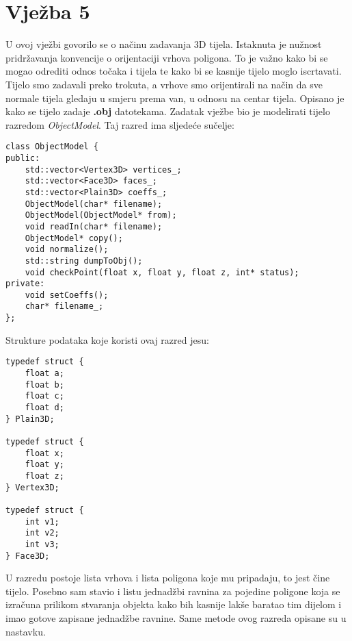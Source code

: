 \documentclass[utf8]{fer}
\begin{document}
\section{Vježba 5}
U ovoj vježbi govorilo se o načinu zadavanja 3D tijela. Istaknuta je nužnost pridržavanja konvencije o orijentaciji vrhova poligona. To je važno kako bi se mogao odrediti odnos točaka i tijela te kako bi se kasnije tijelo moglo iscrtavati. Tijelo smo zadavali preko trokuta, a vrhove smo orijentirali na način da sve normale tijela gledaju u smjeru prema van, u odnosu na centar tijela. Opisano je kako se tijelo zadaje \textbf{.obj} datotekama. Zadatak vježbe bio je modelirati tijelo razredom \textit{ObjectModel}. Taj razred ima sljedeće sučelje:

\begin{lstlisting}
class ObjectModel {
public:
    std::vector<Vertex3D> vertices_;
    std::vector<Face3D> faces_;      
    std::vector<Plain3D> coeffs_;
    ObjectModel(char* filename);
    ObjectModel(ObjectModel* from);
    void readIn(char* filename);
    ObjectModel* copy();
    void normalize();
    std::string dumpToObj();
    void checkPoint(float x, float y, float z, int* status);
private:
    void setCoeffs();
    char* filename_;
};
\end{lstlisting}

Strukture podataka koje koristi ovaj razred jesu:
\begin{lstlisting}
typedef struct {
    float a;
    float b;
    float c;
    float d;
} Plain3D;

typedef struct {
    float x;
    float y;
    float z;
} Vertex3D;

typedef struct {
    int v1;
    int v2;
    int v3;
} Face3D;

\end{lstlisting}

U razredu postoje lista vrhova i lista poligona koje mu pripadaju, to jest čine tijelo. Posebno sam stavio i listu jednadžbi ravnina za pojedine poligone koja se izračuna prilikom stvaranja objekta kako bih kasnije lakše baratao tim dijelom i imao gotove zapisane jednadžbe ravnine. Same metode ovog razreda opisane su u nastavku.
\end{document}
